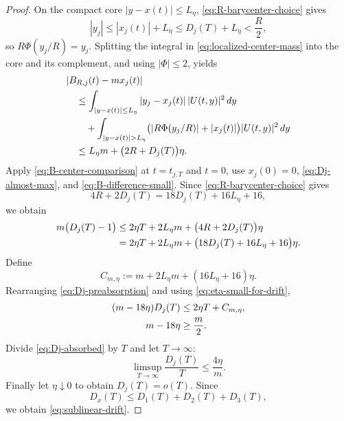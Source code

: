 \documentclass[preprint,12pt]{elsarticle}
\numberwithin{equation}{section}
\theoremstyle{remark}
\newcommand{\dd}{\,d}
\begin{document}
\begin{proof}
On the compact core $|y-x(t)|\le L_\eta$, \eqref{eq:R-barycenter-choice} gives
\begin{equation*}
  |y_j|
  \le |x_j(t)|+L_\eta
  \le D_j(T)+L_\eta
  <\frac R2,
\end{equation*}
so $R\Phi(y_j/R)=y_j$. Splitting the integral in \eqref{eq:localized-center-mass} into the core and its complement, and using $|\Phi|\le2$, yields
\begin{align}
 &|B_{R,j}(t)-m x_j(t)|
\notag\\
 &\quad\le
  \int_{|y-x(t)|\le L_\eta}|y_j-x_j(t)|\,|U(t,y)|^2\dd y
\notag\\
 &\qquad+
  \int_{|y-x(t)|>L_\eta}
  \bigl(|R\Phi(y_j/R)|+|x_j(t)|\bigr)|U(t,y)|^2\dd y
\notag\\
 &\quad\le L_\eta m+\bigl(2R+D_j(T)\bigr)\eta.
  \label{eq:B-center-comparison}
\end{align}
Apply \eqref{eq:B-center-comparison} at $t=t_{j,T}$ and $t=0$, use $x_j(0)=0$, \eqref{eq:Dj-almost-max}, and \eqref{eq:B-difference-small}. Since \eqref{eq:R-barycenter-choice} gives
\begin{equation*}
  4R+2D_j(T)
  =18D_j(T)+16L_\eta+16,
\end{equation*}
we obtain
\begin{align}
  m\bigl(D_j(T)-1\bigr)
  &\le2\eta T+2L_\eta m
  +\bigl(4R+2D_j(T)\bigr)\eta
\notag\\
  &=2\eta T+2L_\eta m
  +\bigl(18D_j(T)+16L_\eta+16\bigr)\eta.
  \label{eq:Dj-preabsorption}
\end{align}
Define
\begin{equation*}
  C_{m,\eta}:=m+2L_\eta m+(16L_\eta+16)\eta.
\end{equation*}
Rearranging \eqref{eq:Dj-preabsorption} and using \eqref{eq:eta-small-for-drift},
\begin{align}
  (m-18\eta)D_j(T)
  &\le2\eta T+C_{m,\eta},
  \label{eq:Dj-absorbed}\\
  m-18\eta&\ge\frac m2.
  \notag
\end{align}
Divide \eqref{eq:Dj-absorbed} by $T$ and let $T\to\infty$:
\begin{equation*}
  \limsup_{T\to\infty}\frac{D_j(T)}T
  \le\frac{4\eta}{m}.
\end{equation*}
Finally let $\eta\downarrow0$ to obtain $D_j(T)=o(T)$. Since
\begin{equation*}
  D_x(T)
  \le D_1(T)+D_2(T)+D_3(T),
\end{equation*}
we obtain \eqref{eq:sublinear-drift}.
\end{proof}
\end{document}
